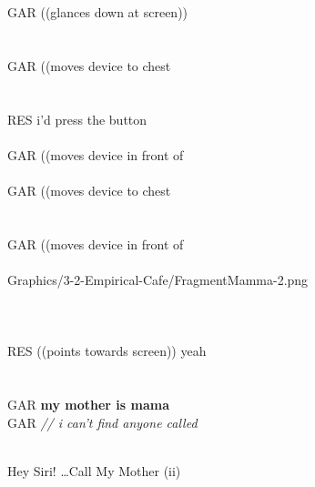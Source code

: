 \begin{revisedsubmission}
\begin{inlinefrag}
    {
    \begin{transcript*}[18]
        \by GAR {((glances down at screen))} \\
         \\
         \\
        \by GAR {((moves device to chest} \\
         \\
         \\
        \by RES {i'd press the button} \\
         \\
        \by GAR {((moves device in front of} \\
         \\
        \by GAR {((moves device to chest} \\
         \\
         \\
        \by GAR {((moves device in front of} \\
         \\
           {Graphics/3-2-Empirical-Cafe/FragmentMamma-2.png}
          \\
         \\
         \\
         \\
        \by RES {((points towards screen)) yeah} \\
         \\
         \\
        \by GAR {\textbf{my mother is mama}} \\
        \by GAR {\textit{// i can’t find anyone called}} \\
         \\
    \end{transcript*}
    \nopagebreak[4]
    \caption{Hey Siri! \ldots Call My Mother (ii)}\label{frag:empirical cafe findings capability-ii}
    }
\end{inlinefrag}


\end{revisedsubmission}
